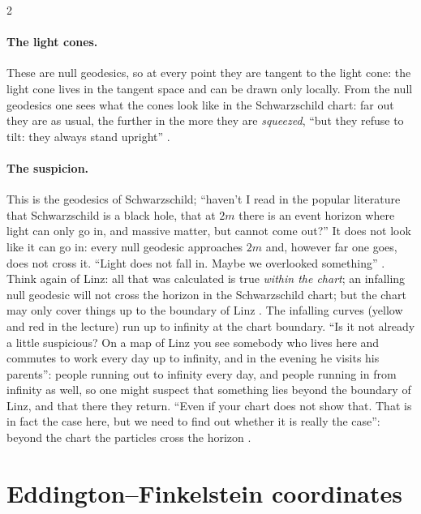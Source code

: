 \begin{paracol}{2}
\paragraph{The light cones.} These are null geodesics, so at every point they are tangent to the light cone: the light cone lives in the tangent space and can be drawn only locally. From the null geodesics one sees what the cones look like in the Schwarzschild chart: far out they are as usual, the further in the more they are \emph{squeezed}, ``but they refuse to tilt: they always stand upright'' .

\paragraph{The suspicion.} This is the geodesics of Schwarzschild; ``haven't I read in the popular literature that Schwarzschild is a black hole, that at $2m$ there is an event horizon where light can only go in, and massive matter, but cannot come out?'' It does not look like it can go in: every null geodesic approaches $2m$ and, however far one goes, does not cross it. ``Light does not fall in. Maybe we overlooked something'' . Think again of Linz: all that was calculated is true \emph{within the chart}; an infalling null geodesic will not cross the horizon in the Schwarzschild chart; but the chart may only cover things up to the boundary of Linz .
The infalling curves (yellow and red in the lecture) run up to infinity at the chart boundary. ``Is it not already a little suspicious? On a map of Linz you see somebody who lives here and commutes to work every day up to infinity, and in the evening he visits his parents'': people running out to infinity every day, and people running in from infinity as well, so one might suspect that something lies beyond the boundary of Linz, and that there they return. ``Even if your chart does not show that. That is in fact the case here, but we need to find out whether it is really the case'': beyond the chart the particles cross the horizon .

\section{Eddington--Finkelstein coordinates}\label{sec:c22-ef}


\end{paracol}
